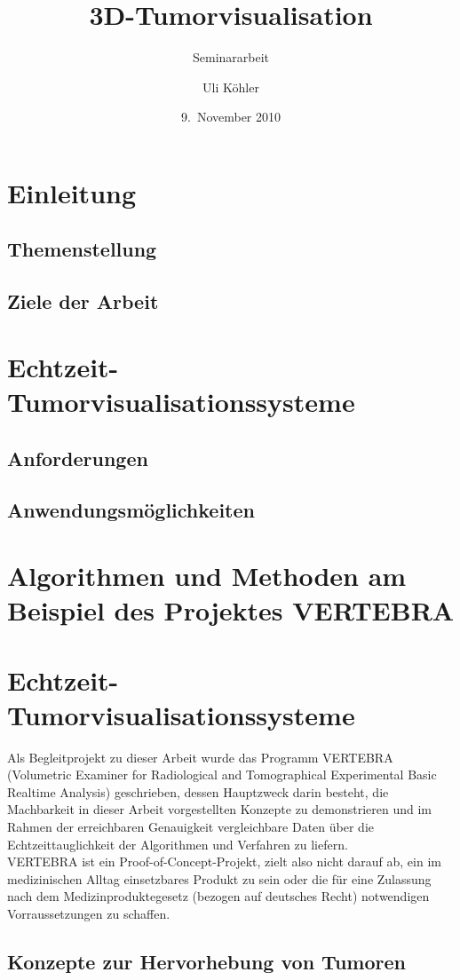 \documentclass[a4paper]{scrartcl}
\title{3D-Tumorvisualisation}
\subtitle{Seminararbeit}
\author{Uli Köhler}
\date{9.~November 2010}
\begin{document}
\maketitle
\tableofcontents
\section{Einleitung}
\subsection{Themenstellung}
\subsection{Ziele der Arbeit}
\section{Echtzeit-Tumorvisualisationssysteme}
\subsection{Anforderungen}
\subsection{Anwendungsmöglichkeiten}
\section{Algorithmen und Methoden am Beispiel des Projektes VERTEBRA}
\section{Echtzeit-Tumorvisualisationssysteme}
Als Begleitprojekt zu dieser Arbeit wurde das Programm VERTEBRA
(Volumetric Examiner for Radiological and Tomographical Experimental Basic Realtime Analysis) geschrieben, dessen Hauptzweck
darin besteht, die Machbarkeit in dieser Arbeit vorgestellten Konzepte zu demonstrieren und im Rahmen der erreichbaren Genauigkeit
vergleichbare Daten über die Echtzeittauglichkeit der Algorithmen und Verfahren zu liefern.\\
VERTEBRA ist ein Proof-of-Concept-Projekt, zielt also nicht darauf ab, ein im medizinischen Alltag einsetzbares Produkt zu sein oder
die für eine Zulassung nach dem Medizinproduktegesetz (bezogen auf deutsches Recht) notwendigen Vorraussetzungen zu schaffen.
\subsection{Konzepte zur Hervorhebung von Tumoren}
\end{document}
